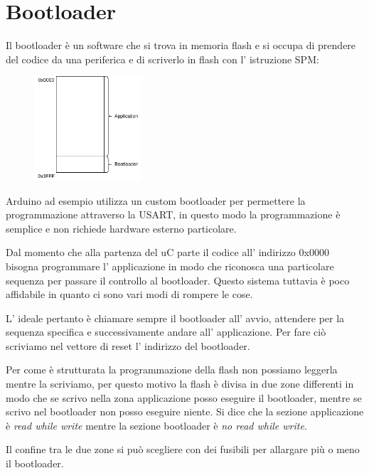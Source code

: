 \section{Bootloader}
Il bootloader è un software che si trova in memoria flash e si occupa di prendere del codice da una periferica e di scriverlo in flash con l' istruzione SPM:
\begin{figure}[H]
    \centering
    \includegraphics[width=150px]{images/27_Bootloader/bootloader.png}
\end{figure}
Arduino ad esempio utilizza un custom bootloader per permettere la programmazione attraverso la USART, in questo modo la programmazione è semplice e non richiede hardware esterno particolare.

Dal momento che alla partenza del uC parte il codice all' indirizzo 0x0000 bisogna programmare l' applicazione in modo che riconosca una particolare sequenza per passare il controllo al bootloader.
Questo sistema tuttavia è poco affidabile in quanto ci sono vari modi di rompere le cose.

L' ideale pertanto è chiamare sempre il bootloader all' avvio, attendere per la sequenza specifica e successivamente andare all' applicazione.
Per fare ciò scriviamo nel vettore di reset l' indirizzo del bootloader.

Per come è strutturata la programmazione della flash non possiamo leggerla mentre la scriviamo, per questo motivo la flash è divisa in due zone differenti in modo che se scrivo nella zona applicazione posso eseguire il bootloader, mentre se scrivo nel bootloader non posso eseguire niente.
Si dice che la sezione applicazione è \emph{read while write} mentre la sezione bootloader è \emph{no read while write}.

Il confine tra le due zone si può scegliere con dei fusibili per allargare più o meno il bootloader.

